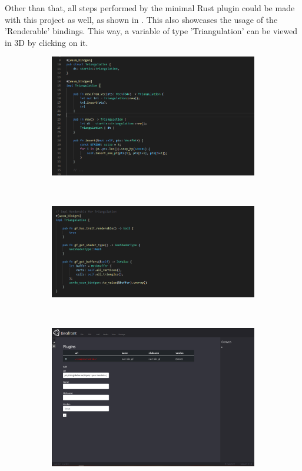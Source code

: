 Other than that, all steps performed by the minimal Rust plugin could be made with this project as well, as shown in . 
This also showcases the usage of the 'Renderable' bindings. 
This way, a variable of type 'Triangulation' can be viewed in 3D by clicking on it.

\begin{figure}
  \centering
  \begin{subfigure}[b]{0.90\linewidth}
    \graphicspath{{../../assets/images/6.1.2}}
    \centering
    \includegraphics[width=\linewidth]{1.PNG}
  \end{subfigure}%
  \\ 
  \begin{subfigure}[b]{0.90\linewidth}
    \graphicspath{{../../assets/images/6.1.2}}
    \centering
    \includegraphics[width=\linewidth]{5.PNG}
  \end{subfigure}%
  \\
  \begin{subfigure}[b]{0.90\linewidth}
    \graphicspath{{../../assets/images/6.1.2}}
    \centering
    \includegraphics[width=\linewidth]{2.PNG}

\end{subfigure}
\end{figure}
